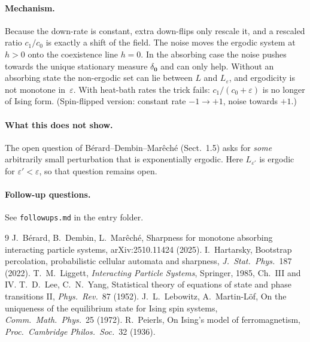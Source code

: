 \documentclass[11pt]{article}
\theoremstyle{remark}\newtheorem*{remark}{Remark}
\begin{document}
\paragraph{Mechanism.} Because the down-rate is constant, extra down-flips only rescale it, and a rescaled ratio $c_1/c_0$ is exactly a shift of the field. The noise moves the ergodic system at $h>0$ onto the coexistence line $h=0$. In the absorbing case the noise pushes towards the unique stationary measure $\delta_{\mathbf 0}$ and can only help. Without an absorbing state the non-ergodic set can lie between $L$ and $L_\varepsilon$, and ergodicity is not monotone in~$\varepsilon$. With heat-bath rates the trick fails: $c_1/(c_0+\varepsilon)$ is no longer of Ising form. (Spin-flipped version: constant rate $-1\to+1$, noise towards $+1$.)

\paragraph{What this does not show.} The open question of Bérard--Dembin--Marêché (Sect.~1.5) asks for \emph{some} arbitrarily small perturbation that is exponentially ergodic. Here $L_{\varepsilon'}$ is ergodic for $\varepsilon'<\varepsilon$, so that question remains open.

\paragraph{Follow-up questions.} See \texttt{followups.md} in the entry folder.

\begin{thebibliography}{9}\small
{} J.~Bérard, B.~Dembin, L.~Marêché, Sharpness for monotone absorbing interacting particle systems, arXiv:2510.11424 (2025).
 I.~Hartarsky, Bootstrap percolation, probabilistic cellular automata and sharpness, \emph{J.\ Stat.\ Phys.}\ 187 (2022).
 T.~M.~Liggett, \emph{Interacting Particle Systems}, Springer, 1985, Ch.~III and IV.
 T.~D.~Lee, C.~N.~Yang, Statistical theory of equations of state and phase transitions II, \emph{Phys.\ Rev.}\ 87 (1952).
 J.~L.~Lebowitz, A.~Martin-Löf, On the uniqueness of the equilibrium state for Ising spin systems, \emph{Comm.\ Math.\ Phys.}\ 25 (1972).
 R.~Peierls, On Ising's model of ferromagnetism, \emph{Proc.\ Cambridge Philos.\ Soc.}\ 32 (1936).
\end{thebibliography}
\end{document}
